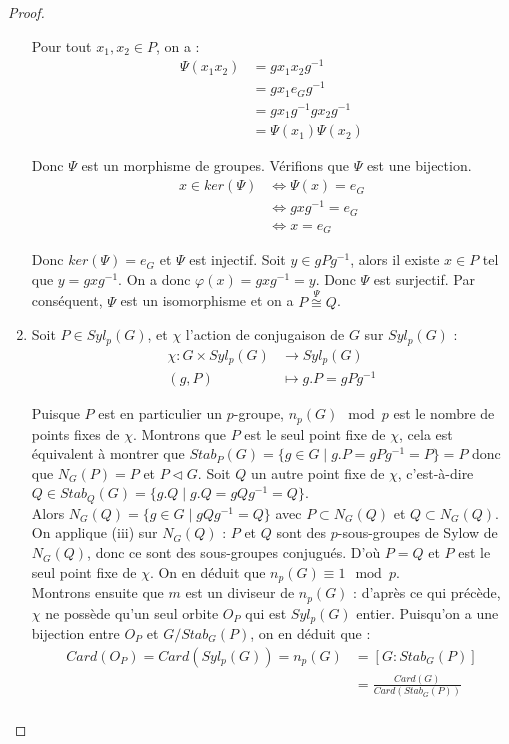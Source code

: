 \documentclass{article}
\theoremstyle{definition}
\theoremstyle{plain}
\theoremstyle{plain}
\theoremstyle{plain}
\theoremstyle{plain}
\theoremstyle{definition}
\theoremstyle{plain}
\theoremstyle{plain}
\begin{document}
\begin{proof}
\begin{enumerate}[label={\upshape(\roman*)}]
Pour tout \( x_1,x_2 \in P \), on a :
\begin{align*}
	\varPsi(x_1x_2) &= gx_1x_2g^{-1} \\
			&= gx_1e_Gg^{-1} \\
			&= gx_1g^{-1}gx_2g^{-1} \\
			&= \varPsi(x_1)\varPsi(x_2) 
\end{align*}

Donc \( \varPsi \) est un morphisme de groupes. Vérifions que \( \varPsi \) est une bijection.
\begin{align*}
	x \in ker(\varPsi) &\iff \varPsi(x) = e_G \\
			   &\iff gxg^{-1} = e_G \\
			   &\iff x = e_G
\end{align*}

Donc \( ker(\varPsi) = e_G \) et \( \varPsi \) est injectif. Soit \( y \in gPg^{-1} \), alors il existe \( x \in P \) tel que \( y = gxg^{-1} \). On a donc \( \varphi(x) = gxg^{-1} = y \). Donc \( \varPsi \) est surjectif. Par conséquent, \( \varPsi \) est un isomorphisme et on a \( P \overset{\varPsi}{\cong} Q \).

\item Soit \( P \in Syl_{p}(G) \), et \( \chi \) l'action de conjugaison de \( G \) sur \( Syl_{p}(G) \) :
\begin{align*}
	\chi : G \times Syl_{p}(G) &\to Syl_{p}(G) \\
	(g,P) &\mapsto g.P = gPg^{-1}
\end{align*}

Puisque \( P \) est en particulier un \(p\)-groupe, \( n_p(G) \mod p \) est le nombre de points fixes de \( \chi \). Montrons que \( P \) est le seul point fixe de \( \chi \), cela est équivalent à montrer que \( Stab_P(G) = \{ g \in G \mid g.P = gPg^{-1} = P \} = P \) donc que \( N_G(P) = P \) et \( P \triangleleft G \). Soit \( Q \) un autre point fixe de \( \chi \), c'est-à-dire \(Q \in Stab_Q(G) = \{g.Q \mid g.Q = gQg^{-1} = Q \}  \). \\
Alors \( N_G(Q) = \{ g \in G \mid gQg^{-1} = Q\} \) avec \( P \subset N_G(Q) \) et \( Q \subset N_G(Q) \). \\
On applique (iii) sur \( N_G(Q) \) : \( P \) et \( Q \) sont des \(p\)-sous-groupes de Sylow de \( N_G(Q) \), donc ce sont des sous-groupes conjugués. D'où \( P = Q \) et \( P \) est le seul point fixe de \( \chi \). On en déduit que \( n_p(G) \equiv 1 \mod p \). \\
Montrons ensuite que \( m \) est un diviseur de \( n_p(G) \) : d'après ce qui précède, \( \chi \) ne possède qu'un seul orbite \( O_P \) qui est \( Syl_p({G}) \) entier. Puisqu'on a une bijection entre \( O_P \) et \( G/Stab_G(P) \), on en déduit que :
\begin{align*}
	Card(O_P)= Card(Syl_p(G)) = n_p(G) &= [G : Stab_G(P) ] \\ 
		 &= \frac{Card(G)}{Card(Stab_G(P))}\\
\end{align*}


\end{enumerate}
\end{proof}
\end{document}

